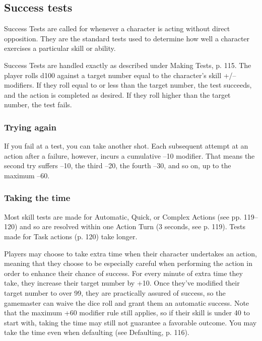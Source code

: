 \subsection{Success tests} \label{sec:success-tests} 

Success Tests are called for whenever a character is acting without direct opposition. They are the standard tests used to determine how well a character exercises a particular skill or ability. 

Success Tests are handled exactly as described under Making Tests, p. 115. The player rolls d100 against a target number equal to the character's skill +/– modifiers. If they roll equal to or less than the target number, the test succeeds, and the action is completed as desired. If they roll higher than the target number, the test fails. 

\subsubsection{Trying again} \label{sec:trying-again} 

If you fail at a test, you can take another shot. Each subsequent attempt at an action after a failure, however, incurs a cumulative –10 modifier. That means the second try suffers –10, the third –20, the fourth –30, and so on, up to the maximum –60. 

\subsubsection{Taking the time} \label{sec:taking-time} 

Most skill tests are made for Automatic, Quick, or Complex Actions (see pp. 119–120) and so are resolved within one Action Turn (3 seconds, see p. 119). Tests made for Task actions (p. 120) take longer. 

Players may choose to take extra time when their character undertakes an action, meaning that they choose to be especially careful when performing the action in order to enhance their chance of success. For every minute of extra time they take, they increase their target number by +10. Once they've modified their target number to over 99, they are practically assured of success, so the gamemaster can waive the dice roll and grant them an automatic success. Note that the maximum +60 modifier rule still applies, so if their skill is under 40 to start with, taking the time may still not guarantee a favorable outcome. You may take the time even when defaulting (see Defaulting, p. 116). 

